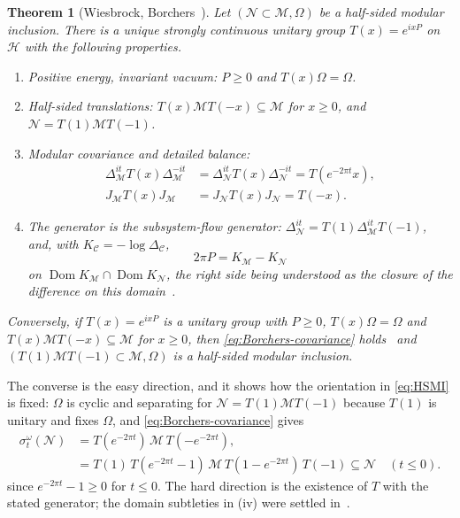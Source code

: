 \documentclass[a4paper,11pt]{article}
\newtheorem{theorem}{Theorem}
\theoremstyle{definition}
\newcommand{\mN}{\mathcal{N}}
\newcommand{\mM}{\mathcal{M}}
\begin{document}
\begin{theorem}[Wiesbrock, Borchers~{\cite{Wiesbrock1993,Borchers1992,ArakiZsido2005}}]\label{thm:HSMI}
Let $(\mN\subset\mM,\Omega)$ be a half-sided modular inclusion. There is a unique strongly continuous unitary group $T(x)=e^{ixP}$ on $\mathcal H$ with the following properties.
\begin{enumerate}
 \item[\rm(i)] \emph{Positive energy, invariant vacuum:} $P\ge0$ and $T(x)\Omega=\Omega$.
 \item[\rm(ii)] \emph{Half-sided translations:} $T(x)\mM T(-x)\subseteq\mM$ for $x\ge0$, and $\mN=T(1)\mM T(-1)$.
 \item[\rm(iii)] \emph{Modular covariance and detailed balance:}
 \begin{equation}
 \begin{aligned}
  \Delta_{\mM}^{it}T(x)\Delta_{\mM}^{-it}
  &=\Delta_{\mN}^{it}T(x)\Delta_{\mN}^{-it}=T(e^{-2\pi t}x),\\
  J_{\mM}T(x)J_{\mM}
  &=J_{\mN}T(x)J_{\mN}=T(-x).
 \end{aligned}
 \label{eq:Borchers-covariance}
\end{equation}
 \item[\rm(iv)] \emph{The generator is the subsystem-flow generator:} $\Delta_{\mN}^{it}=T(1)\Delta_{\mM}^{it}T(-1)$, and, with $K_{\mathcal C}=-\log\Delta_{\mathcal C}$,
 \begin{equation}
  2\pi P=K_{\mM}-K_{\mN}
  \label{eq:HSMI-P}
 \end{equation}
 on $\operatorname{Dom}K_{\mM}\cap\operatorname{Dom}K_{\mN}$, the right side being understood as the closure of the difference on this domain~\cite{ArakiZsido2005}.
\end{enumerate}
Conversely, if $T(x)=e^{ixP}$ is a unitary group with $P\ge0$, $T(x)\Omega=\Omega$ and $T(x)\mM T(-x)\subseteq\mM$ for $x\ge0$, then \eqref{eq:Borchers-covariance} holds~\cite{Borchers1992} and $(T(1)\mM T(-1)\subset\mM,\Omega)$ is a half-sided modular inclusion.
\end{theorem}

The converse is the easy direction, and it shows how the orientation in \eqref{eq:HSMI} is fixed: $\Omega$ is cyclic and separating for $\mN=T(1)\mM T(-1)$ because $T(1)$ is unitary and fixes $\Omega$, and \eqref{eq:Borchers-covariance} gives
\begin{equation}
 \begin{aligned}
 \sigma_t^\omega(\mN)
 &=T(e^{-2\pi t})\,\mM\,T(-e^{-2\pi t}),\\
 &=T(1)\,T(e^{-2\pi t}-1)\,\mM\,T(1-e^{-2\pi t})\,T(-1)
 \subseteq\mN\quad(t\le0).
 \end{aligned}
 \label{eq:HSMI-orbit}
\end{equation}
since $e^{-2\pi t}-1\ge0$ for $t\le0$. The hard direction is the existence of $T$ with the stated generator; the domain subtleties in (iv) were settled in~\cite{ArakiZsido2005}.
\end{document}
